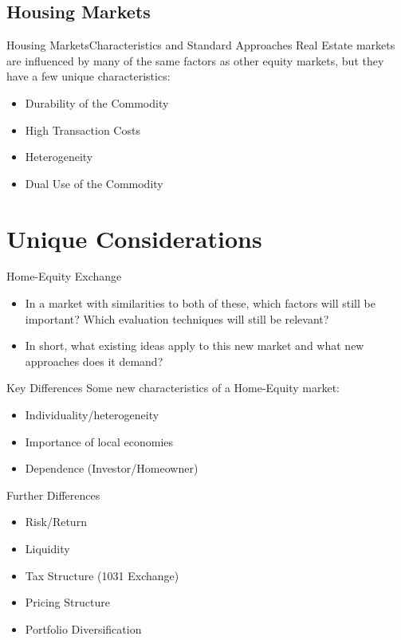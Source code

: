 \documentclass{beamer}
\begin{document}
\subsection{Housing Markets}
\begin{frame}{Housing Markets}{Characteristics and Standard Approaches}
Real Estate markets are influenced by many of the same factors as other equity markets, but they have a few unique characteristics:
\pause
\begin{itemize}
\item
Durability of the Commodity
\pause
\item
High Transaction Costs
\pause
\item
Heterogeneity
\pause
\item
Dual Use of the Commodity
\end{itemize}

\end{frame}


\section{Unique Considerations}

\begin{frame}{Home-Equity Exchange}
\begin{itemize}
\item
In a market with similarities to both of these, which factors will still be important? Which evaluation techniques will still be relevant?
\item
In short, what existing ideas apply %
 to this new market and what new approaches does it demand? 
\end{itemize} 
\end{frame}


\begin{frame}{Key Differences}
Some new characteristics of a Home-Equity market:
\pause
\begin{itemize}
\item
Individuality/heterogeneity
\pause
\item
Importance of local economies
\pause
\item
Dependence (Investor/Homeowner)
\end{itemize}

\end{frame}




\begin{frame}{Further Differences}
\begin{itemize}
\item
Risk/Return
\item
Liquidity
\item
Tax Structure (1031 Exchange)
\item
Pricing Structure
\item
Portfolio Diversification
\end{itemize}
\end{frame}
\end{document}
